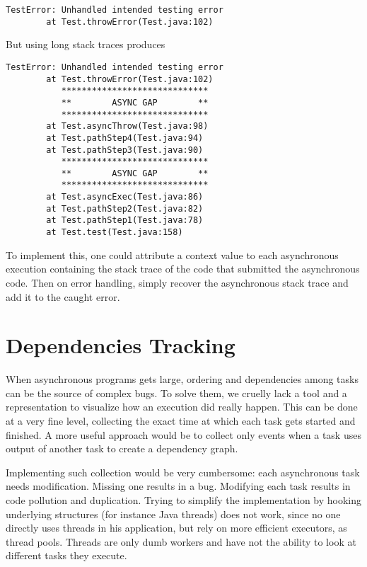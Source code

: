 \begin{lstlisting}
TestError: Unhandled intended testing error
        at Test.throwError(Test.java:102)
\end{lstlisting}

But using long stack traces produces

\begin{lstlisting}
TestError: Unhandled intended testing error
        at Test.throwError(Test.java:102)
           *****************************
           **        ASYNC GAP        **
           *****************************
        at Test.asyncThrow(Test.java:98)
        at Test.pathStep4(Test.java:94)
        at Test.pathStep3(Test.java:90)
           *****************************
           **        ASYNC GAP        **
           *****************************
        at Test.asyncExec(Test.java:86)
        at Test.pathStep2(Test.java:82)
        at Test.pathStep1(Test.java:78)
        at Test.test(Test.java:158)
\end{lstlisting}


To implement this, one could attribute a context value to each asynchronous execution containing the stack trace of the code that submitted the asynchronous code. Then on error handling, simply recover the asynchronous stack trace and add it to the caught error.

\section{Dependencies Tracking}

When asynchronous programs gets large, ordering and dependencies among tasks can be the source of complex bugs. To solve them, we cruelly lack a tool and a representation to visualize how an execution did really happen. This can be done at a very fine level, collecting the exact time at which each task gets started and finished. A more useful approach would be to collect only events when a task uses output of another task to create a dependency graph.

Implementing such collection would be very cumbersome: each asynchronous task needs modification. Missing one results in a bug. Modifying each task results in code pollution and duplication. Trying to simplify the implementation by hooking underlying structures (for instance Java threads) does not work, since no one directly uses threads in his application, but rely on more efficient executors, as thread pools. Threads are only dumb workers and have not the ability to look at different tasks they execute.

